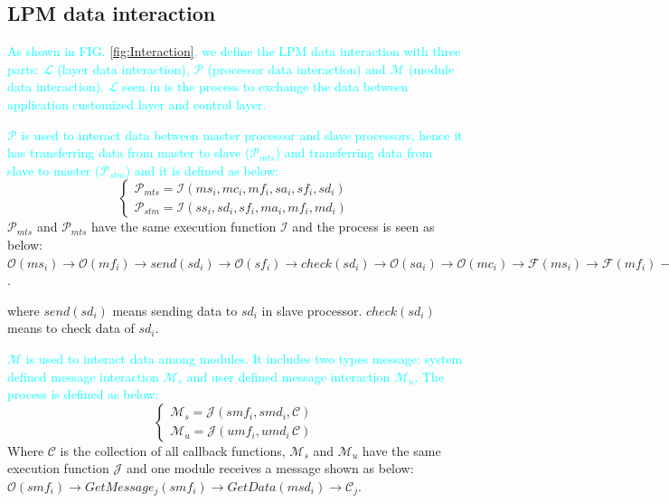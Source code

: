 \documentclass[journal,UTF8]{IEEEtran}
\begin{document}
 \subsection{LPM data interaction}
 \textcolor{cyan}{As shown in FIG. \ref{fig:Interaction}, we define the LPM data interaction with three parts: $\mathcal{L}$ (layer data interaction), $\mathcal{P}$ (processor data interaction) and $\mathcal{M}$ (module data interaction). $\mathcal{L}$ seen in \cite{WuA} is the process to exchange the data between application customized layer and control layer.}

 \textcolor{cyan}{$\mathcal{P}$ is used to interact data between master processor and slave processors, hence it has transferring data from master to slave ($\mathcal{P}_{mts}$) and transferring data from slave to master ($\mathcal{P}_{stm}$) and it is defined as below:}
 \begin{equation}
 \left\{
 \begin{array}{l}
 \mathcal{P}_{mts} = \mathcal{I} (ms_i,mc_i,mf_i,sa_i,sf_i,sd_i)\\
 \mathcal{P}_{stm} = \mathcal{I} (ss_i,sd_i,sf_i,ma_i,mf_i,md_i)
 \end{array}
 \right.
 \end{equation}
 $\mathcal{P}_{mts}$ and $\mathcal{P}_{mts}$ have the same execution function $\mathcal{I}$ and the process is seen as below:
 $\mathcal{O}(ms_i)\to\mathcal{O}(mf_i)\to send(sd_i)\to\mathcal{O}(sf_i)\to check(sd_i)\to\mathcal{O}(sa_i)\to\mathcal{O}(mc_i)\to\mathcal{F}(ms_i)\to\mathcal{F}(mf_i)\to\mathcal{F}(mc_i)\to\mathcal{F}(sf_i)\to\mathcal{F}(sa_i)$.
 
 where $send(sd_i)$ means sending data to $sd_i$ in slave processor. $check(sd_i)$ means to check data of $sd_i$.
 
\textcolor{cyan}{$\mathcal{M}$ is used to interact data among modules. It includes two types message: system defined message interaction $\mathcal{M}_{s}$ and user defined message interaction $\mathcal{M}_{u}$. The process is defined as below:}
 \begin{equation}
\left\{
\begin{array}{l}
\mathcal{M}_{s} = \mathcal{J} (smf_i,smd_i,\mathcal{C})\\
\mathcal{M}_{u} = \mathcal{J} (umf_i,umd_i\,\mathcal{C})
\end{array}
\right.
\end{equation}
Where $\mathcal{C}$ is the collection of all callback functions, $\mathcal{M}_{s}$ and $\mathcal{M}_{u}$ have the same execution function $\mathcal{J}$ and one module receives a message shown as below:
$\mathcal{O}(smf_i)\to GetMessage_{j}(smf_i)\to GetData(msd_i)\to\mathcal{C}_j$.
\end{document}
